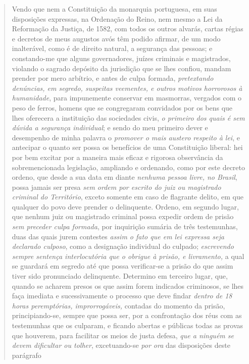 \begin{quote}
Vendo que nem a Constituição da monarquia portuguesa, em suas
disposições expressas, na Ordenação do Reino, nem mesmo a Lei da
Reformação da Justiça, de 1582, com todos os outros alvarás, cartas
régias e decretos de meus augustos avós têm podido afirmar, de um modo
inalterável, como é de direito natural, a segurança das pessoas; e
constando-me que alguns governadores, juízes criminais e magistrados,
violando o sagrado depósito da jurisdição que se lhes confiou, mandam
prender por mero arbítrio, e antes de culpa formada, \emph{pretextando
denúncias, em segredo, suspeitas veementes, e outros motivos horrorosos
à humanidade}, para impunemente conservar em masmorras, vergados com o
peso de ferros, homens que se congregaram convidados por os bens que
lhes oferecera a instituição das sociedades civis, \emph{o primeiro dos
quais é sem dúvida a segurança individual}; e sendo do meu primeiro
dever e desempenho de minha palavra o \emph{promover o mais austero
respeito à lei}, e antecipar o quanto ser possa os benefícios de uma
Constituição liberal: hei por bem excitar por a maneira mais eficaz e
rigorosa observância da sobremencionada legislação, ampliando e
ordenando, como por este decreto ordeno, que desde a sua data em diante
\emph{nenhuma pessoa livre, no Brasil}, possa jamais ser presa \emph{sem
ordem por escrito do juiz ou magistrado criminal do Território}, exceto
somente em caso de flagrante delito, em que qualquer do povo deve
prender o delinquente. Ordeno, em segundo lugar, que nenhum juiz ou
magistrado criminal possa expedir ordem de prisão \emph{sem preceder
culpa formada}, por inquirição sumária de três testemunhas, duas das
quais jurem contestes \emph{assim o fato que em lei expressa seja
declarado culposo}, como a designação individual do culpado;
\emph{escrevendo sempre sentença interlocutória que o obrigue à prisão,
e livramento,} a qual se guardará em segredo até que possa verificar-se
a prisão do que assim tiver sido pronunciado delinquente. Determino em
terceiro lugar, que, quando se acharem presos os que assim forem
indicados criminosos, se lhes faça imediata e sucessivamente o processo
que deve findar \emph{dentro de 18 horas peremptórias, improrrogáveis,}
contadas do momento da prisão, principiando-se, sempre que possa ser,
por a confrontação dos réus com as testemunhas que os culparam, e
ficando abertas e públicas todas as provas que houverem, para facilitar
os meios de justa defesa, \emph{que a ninguém se devem dificultar ou
tolher}, excetuando-se \emph{por ora} das disposições deste parágrafo

\end{quote}
